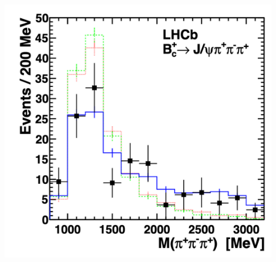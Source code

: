 \documentclass{beamer}
\begin{document}
\begin{frame}
\begin{columns}
\begin{column}{0.5\textwidth}
      \includegraphics[width = 0.9\textwidth]{1204_0079_Fig2}
    \end{column}
  \end{columns}
\end{frame}
\end{document}
